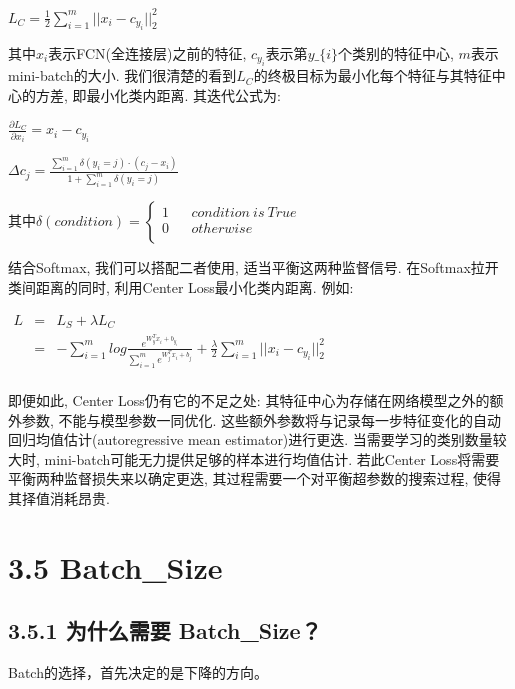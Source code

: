 \(L_{C} = \frac{1}{2}\sum^{m}_{i=1}||x_{i}-c_{y_{i}}||^{2}_{2}\)

其中\(x_{i}\)表示FCN(全连接层)之前的特征, \(c_{y_{i}}\)表示第$y\_\{i\}
$个类别的特征中心, \(m\)表示mini-batch的大小.
我们很清楚的看到\(L_{C}\)的终极目标为最小化每个特征与其特征中心的方差,
即最小化类内距离. 其迭代公式为:

\(\frac{\partial L_{C}}{\partial x_{i}}=x_{i}-c_{y_{i}}\)

\(\Delta{c_{j}} = \frac{\sum^{m}_{i=1}\delta(y_{i}=j)\cdot(c_{j}-x_{i})}{1+\sum^{m}_{i=1}\delta(y_{i}=j)}\)

其中$ \delta(condition)=\left\{

\begin{array}{rcl}
1       &      & {condition\ is\ True}\\
0     &      & {otherwise}\\ \end{array}

\right.$

结合Softmax, 我们可以搭配二者使用, 适当平衡这两种监督信号.
在Softmax拉开类间距离的同时, 利用Center Loss最小化类内距离. 例如:

\(\begin{eqnarray}L & = & L_{S} + \lambda L_{C} \\ &=& -\sum^{m}_{i=1}log\frac{e^{W_{y}^{T}x_{i}+b_{y_{i}}}}{\sum^{m}_{i=1}e^{W^{T}_{j}x_{i}+b_{j}}} + \frac{\lambda}{2}\sum^{m}_{i=1}||x_{i}-c_{y_{i}}||^{2}_{2}\\ \end{eqnarray}\)

即便如此, Center Loss仍有它的不足之处:
其特征中心为存储在网络模型之外的额外参数, 不能与模型参数一同优化.
这些额外参数将与记录每一步特征变化的自动回归均值估计(autoregressive mean
estimator)进行更迭. 当需要学习的类别数量较大时,
mini-batch可能无力提供足够的样本进行均值估计. 若此Center
Loss将需要平衡两种监督损失来以确定更迭,
其过程需要一个对平衡超参数的搜索过程, 使得其择值消耗昂贵.

\section{3.5 Batch\_Size}\label{batch_size}

\subsection{3.5.1 为什么需要
Batch\_Size？}\label{ux4e3aux4ec0ux4e48ux9700ux8981-batch_size}

Batch的选择，首先决定的是下降的方向。

